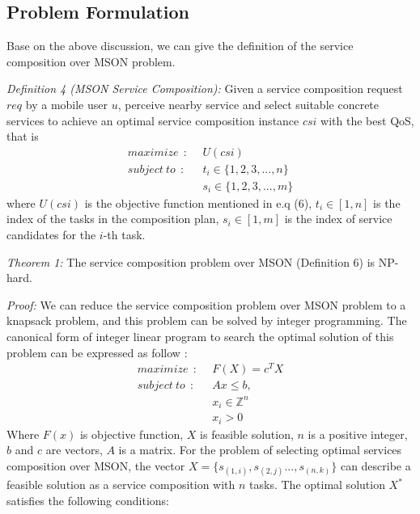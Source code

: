 \documentclass[10pt,journal,compsoc]{IEEEtran}
\begin{document}
\subsection{Problem Formulation}
Base on the above discussion, we can give the definition of the service composition over MSON problem.

\textit{Definition 4 (MSON Service Composition):} Given a service composition request $req$ by a mobile user $u$, perceive nearby service and select suitable concrete services to achieve an optimal service composition instance $csi$ with the best QoS, that is
\begin{align}
maximize      \ \ : \ \ & U(csi)   \\\nonumber
subject\ to   \ \ : \ \ & t_i \in \{1,2,3,...,n\}  \\\nonumber
                        & s_i \in \{1,2,3,...,m \}
\end{align}
where $U(csi)$ is the objective function mentioned in e.q (6), $t_i \in [1,n]$ is the index of the tasks in the composition plan, $s_i \in [1, m]$ is the index of service candidates for the $i$-th task.

\textit{Theorem 1:} The service composition problem over MSON (Definition 6) is NP-hard.

\textit{Proof:} We can reduce the service composition problem over MSON problem to a knapsack problem, and this problem can be solved by integer programming. 
The canonical form of integer linear program to search the optimal solution of this problem can be expressed as follow \cite{papadimitriou1998combinatorial}:\
\begin{align}
maximize     \ \ : \ \ & F(X) = c^{T}X     \\\nonumber
subject\ to  \ \ : \ \ & Ax \le b, \\\nonumber
               	       & x_i \in \mathbb{Z}^{n} \\\nonumber
                       & x_i > 0 
\end{align}
Where $F(x)$ is objective function, $X$ is feasible solution, $n$ is a positive integer, $b$ and $c$ are vectors, $A$ is a matrix.
For the problem of selecting optimal services composition over MSON, the vector $X = \{s_{(1,i)}, s_{(2,j)}. . . , s_{(n,k)}\}$ can describe a feasible solution as a service composition with $n$ tasks. 
The optimal solution  $X^*$ satisfies the following conditions:
\end{document}
